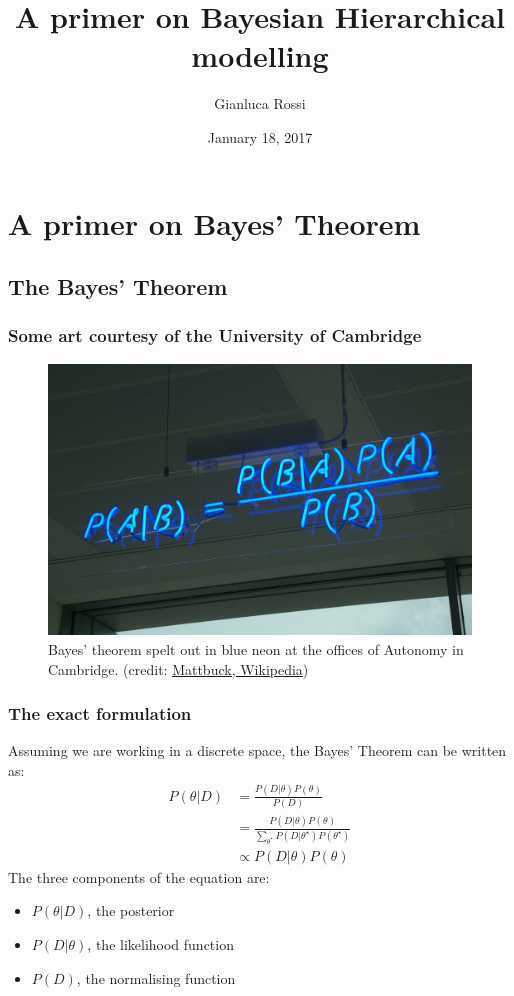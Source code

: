\documentclass[11pt]{beamer}
\author{Gianluca Rossi}
\title{A primer on Bayesian Hierarchical modelling}
\date{January 18, 2017}
\begin{document}
\begin{frame}
	\titlepage
\end{frame}


\begin{frame}
	\tableofcontents
\end{frame}


\section{A primer on Bayes' Theorem}
\subsection{The Bayes' Theorem}
\begin{frame}
	\frametitle{Some art courtesy of the University of Cambridge}
	\begin{figure}
		\includegraphics[scale=0.12]{./images/Bayes'_Theorem_MMB_01.jpg}
		\caption{Bayes' theorem spelt out in blue neon at the offices of Autonomy in Cambridge. (credit: \href{https://commons.wikimedia.org/wiki/User:Mattbuck}{Mattbuck, Wikipedia})}	
	\end{figure}
	
\end{frame}

\begin{frame}
	\frametitle{The exact formulation}
	Assuming we are working in a discrete space, the Bayes' Theorem can be written as:
	\begin{align}
		P(\theta | D) &= \frac{P(D | \theta) P(\theta)}{P(D)} \\
		&= \frac{P(D|\theta) P(\theta)}{\sum_{\theta^{\star}} P(D | \theta^{\star}) P(\theta^{\star})} \\
		&\propto P(D|\theta) P(\theta)
	\end{align}
	The three components of the equation are:
	\begin{itemize}
		\item $P(\theta | D)$, the posterior
		\item $P(D | \theta)$, the likelihood function
		\item $P(D)$, the normalising function
	\end{itemize}
\end{frame}
\end{document}
